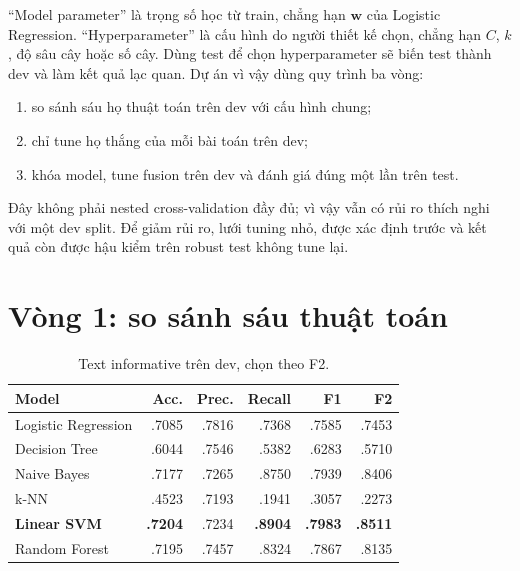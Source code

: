 ``Model parameter'' là trọng số học từ train, chẳng hạn \(\mathbf{w}\) của
Logistic Regression. ``Hyperparameter'' là cấu hình do người thiết kế chọn,
chẳng hạn \(C\), \(k\), độ sâu cây hoặc số cây. Dùng test để chọn
hyperparameter sẽ biến test thành dev và làm kết quả lạc quan. Dự án vì vậy dùng
quy trình ba vòng:

\begin{enumerate}[leftmargin=*]
  \item so sánh sáu họ thuật toán trên dev với cấu hình chung;
  \item chỉ tune họ thắng của mỗi bài toán trên dev;
  \item khóa model, tune fusion trên dev và đánh giá đúng một lần trên test.
\end{enumerate}

Đây không phải nested cross-validation đầy đủ; vì vậy vẫn có rủi ro thích nghi
với một dev split. Để giảm rủi ro, lưới tuning nhỏ, được xác định trước và kết
quả còn được hậu kiểm trên robust test không tune lại.

\section{Vòng 1: so sánh sáu thuật toán}

\begin{table}[H]\centering\scriptsize
\caption{Text informative trên dev, chọn theo F2.}
\begin{tabular}{lrrrrr}
\toprule
\textbf{Model} & \textbf{Acc.} & \textbf{Prec.} & \textbf{Recall} & \textbf{F1} & \textbf{F2}\\
\midrule
Logistic Regression & .7085 & .7816 & .7368 & .7585 & .7453\\
Decision Tree & .6044 & .7546 & .5382 & .6283 & .5710\\
Naive Bayes & .7177 & .7265 & .8750 & .7939 & .8406\\
k-NN & .4523 & .7193 & .1941 & .3057 & .2273\\
\textbf{Linear SVM} & \textbf{.7204} & .7234 & \textbf{.8904} & \textbf{.7983} & \textbf{.8511}\\
Random Forest & .7195 & .7457 & .8324 & .7867 & .8135\\
\bottomrule
\end{tabular}
\end{table}

